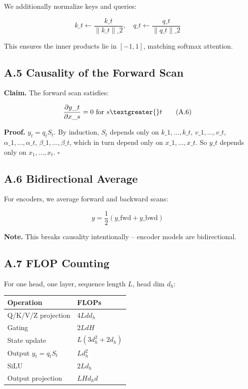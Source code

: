We additionally normalize keys and queries:

\[
k\_t \leftarrow \frac{k\_t}{\|k\_t\|\_2}, \quad
q\_t \leftarrow \frac{q\_t}{\|q\_t\|\_2}
\tag{A.5}
\]

This ensures the inner products lie in $[-1, 1]$, matching softmax attention.

\subsection{A.5 Causality of the Forward Scan}

\textbf{Claim.} The forward scan satisfies:

\[
\frac{\partial y\_t}{\partial x\_s} = 0 \text{ for } s \textgreater{} t
\tag{A.6}
\]

\textbf{Proof.} $y_t = q_t S_t$. By induction, $S_t$ depends only on $k\_1, 
\dots, k\_t$, $v\_1, \dots, v\_t$, $\alpha\_1, \dots, \alpha\_t$, $\beta\_1, 
\dots, \beta\_t$, which in turn depend only on $x\_1, \dots, x\_t$. So $y\_t$ 
depends only on $x_1, \dots, x_t$. $\square$

\subsection{A.6 Bidirectional Average}

For encoders, we average forward and backward scans:

\[
y = \frac{1}{2}(y\_\text{fwd} + y\_\text{bwd})
\tag{A.7}
\]

\textbf{Note.} This breaks causality intentionally -- encoder models are 
bidirectional.

\subsection{A.7 FLOP Counting}

For one head, one layer, sequence length $L$, head dim $d_h$:

\begin{table}[H]
\centering
\small
\begin{tabular}{ll}
\toprule
\textbf{Operation} & \textbf{FLOPs} \\
\midrule
Q/K/V/Z projection & $4 L d d_h$ \\
Gating & $2 L d H$ \\
State update & $L (3 d_h^2 + 2 d_h)$ \\
Output $y_t = q_t S_t$ & $L d_h^2$ \\
SiLU & $2 L d_h$ \\
Output projection & $L H d_h d$ \\
\bottomrule
\end{tabular}
\end{table}


